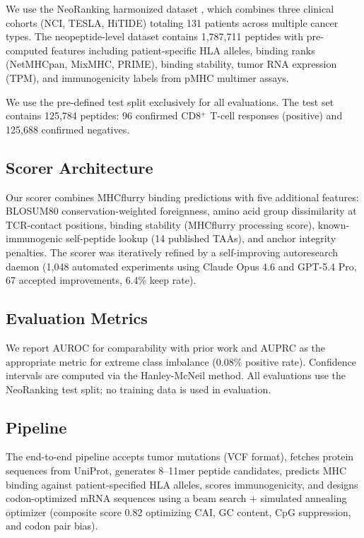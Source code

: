 \documentclass[11pt,twocolumn]{article}
\begin{document}
We use the NeoRanking harmonized dataset \cite{muller2023neoranking}, which combines three clinical cohorts (NCI, TESLA, HiTIDE) totaling 131 patients across multiple cancer types. The neopeptide-level dataset contains 1,787,711 peptides with pre-computed features including patient-specific HLA alleles, binding ranks (NetMHCpan, MixMHC, PRIME), binding stability, tumor RNA expression (TPM), and immunogenicity labels from pMHC multimer assays.

We use the pre-defined test split exclusively for all evaluations. The test set contains 125,784 peptides: 96 confirmed CD8$^{+}$ T-cell responses (positive) and 125,688 confirmed negatives.

\subsection{Scorer Architecture}

Our scorer combines MHCflurry \cite{odonnell2018mhcflurry} binding predictions with five additional features: BLOSUM80 conservation-weighted foreignness, amino acid group dissimilarity at TCR-contact positions, binding stability (MHCflurry processing score), known-immunogenic self-peptide lookup (14 published TAAs), and anchor integrity penalties. The scorer was iteratively refined by a self-improving autoresearch daemon (1,048 automated experiments using Claude Opus 4.6 and GPT-5.4 Pro, 67 accepted improvements, 6.4\% keep rate).

\subsection{Evaluation Metrics}

We report AUROC for comparability with prior work and AUPRC as the appropriate metric for extreme class imbalance (0.08\% positive rate). Confidence intervals are computed via the Hanley-McNeil method. All evaluations use the NeoRanking test split; no training data is used in evaluation.

\subsection{Pipeline}

The end-to-end pipeline accepts tumor mutations (VCF format), fetches protein sequences from UniProt, generates 8--11mer peptide candidates, predicts MHC binding against patient-specified HLA alleles, scores immunogenicity, and designs codon-optimized mRNA sequences using a beam search + simulated annealing optimizer (composite score 0.82 optimizing CAI, GC content, CpG suppression, and codon pair bias).
\end{document}

